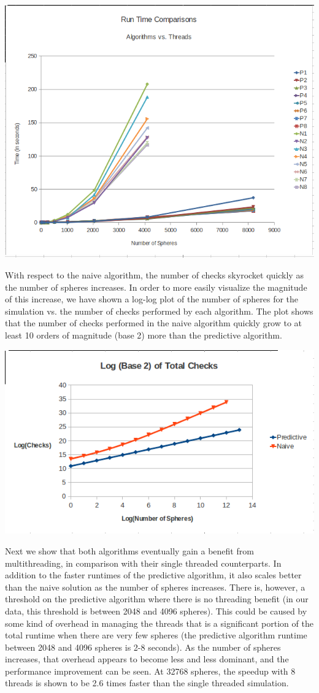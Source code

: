 \documentclass[conference]{IEEEtran}
\begin{document}
\begin{center}
	\includegraphics[width=.45\textwidth]{runtime_comparison.png}
\end{center}

With respect to the naive algorithm, the number of checks skyrocket quickly as the number of spheres increases.  In order to more easily visualize the magnitude of this increase, we have shown a log-log plot of the number of spheres for the simulation vs. the number of checks performed by each algorithm.  The plot shows that the number of checks performed in the naive algorithm quickly grow to at least 10 orders of magnitude (base 2) more than the predictive algorithm.

\begin{center}
	\includegraphics[width=.45\textwidth]{log_total_checks_comparison.png}
\end{center}

Next we show that both algorithms eventually gain a benefit from multithreading, in comparison with their single threaded counterparts.  In addition to the faster runtimes of the predictive algorithm, it also scales better than the naive solution as the number of spheres increases.  There is, however, a threshold on the predictive algorithm where there is no threading benefit (in our data, this threshold is between 2048 and 4096 spheres).  This could be caused by some kind of overhead in managing the threads that is a significant portion of the total runtime when there are very few spheres (the predictive algorithm runtime between 2048 and 4096 spheres is 2-8 seconds).  As the number of spheres increases, that overhead appears to become less and less dominant, and the performance improvement can be seen.  At 32768 spheres, the speedup with 8 threads is shown to be 2.6 times faster than the single threaded simulation.
\end{document}
